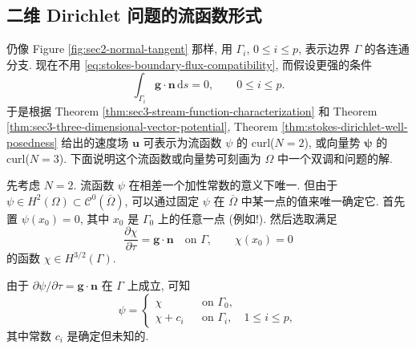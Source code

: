 \subsection{二维 Dirichlet 问题的流函数形式}
\label{subsec:stokes-dirichlet-stream-function}

仍像 Figure \ref{fig:sec2-normal-tangent} 那样, 用
$\Gamma_i$, $0\le i\le p$, 表示边界 $\Gamma$ 的各连通分支.
现在不用 \eqref{eq:stokes-boundary-flux-compatibility},
而假设更强的条件
\begin{equation}\label{eq:stokes-componentwise-flux-compatibility}
\int_{\Gamma_i}\mathbf{g}\cdot\mathbf{n}\,\mathrm{d}s=0,
\qquad 0\le i\le p.
\end{equation}
于是根据 Theorem \ref{thm:sec3-stream-function-characterization}
和 Theorem \ref{thm:sec3-three-dimensional-vector-potential},
Theorem \ref{thm:stokes-dirichlet-well-posedness} 给出的速度场
$\mathbf{u}$ 可表示为流函数 $\psi$ 的 curl($N=2$),
或向量势 $\boldsymbol{\psi}$ 的 curl($N=3$).
下面说明这个流函数或向量势可刻画为 $\Omega$ 中一个双调和问题的解.

先考虑 $N=2$. 流函数 $\psi$ 在相差一个加性常数的意义下唯一.
但由于
$\psi\in H^2(\Omega)\subset\mathcal{C}^0(\overline{\Omega})$,
可以通过固定 $\psi$ 在 $\overline{\Omega}$ 中某一点的值来唯一确定它.
首先置 $\psi(x_0)=0$, 其中 $x_0$ 是 $\Gamma_0$ 上的任意一点
(例如!). 然后选取满足
\begin{equation}\label{eq:stokes-stream-boundary-primitive}
\frac{\partial\chi}{\partial\tau}
=\mathbf{g}\cdot\mathbf{n}
\quad\text{on }\Gamma,
\qquad
\chi(x_0)=0
\end{equation}
的函数 $\chi\in H^{3/2}(\Gamma)$.

由于
$\partial\psi/\partial\tau
=\mathbf{g}\cdot\mathbf{n}$ 在 $\Gamma$ 上成立, 可知
\[
\psi=
\left\{
\begin{aligned}
\chi&&\text{on }\Gamma_0,\\
\chi+c_i&&\text{on }\Gamma_i,
\quad 1\le i\le p,
\end{aligned}
\right.
\]
其中常数 $c_i$ 是确定但未知的.

